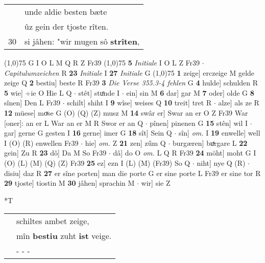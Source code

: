 \documentclass[8pt,a4paper,notitlepage]{article}
\begin{document}
\begin{table}[ht]
\begin{minipage}[t]{0.5\linewidth}
\begin{tabular}{rl}
 & unde aldie besten bæte\\ 
 & ûz gein der tjoste rîten.\\ 
30 & si jâhen: "wir mugen sô \textbf{strîten},\\ 
\end{tabular}
\scriptsize
\line(1,0){75} \newline
G I O L M Q R Z Fr39 \newline
\line(1,0){75} \newline
\textbf{5} \textit{Initiale} I O L Z Fr39   $\cdot$ \textit{Capitulumzeichen} R  \textbf{23} \textit{Initiale} I  \textbf{27} \textit{Initiale} G  \newline
\line(1,0){75} \newline
\textbf{1} zeige] erczeige M gelde zeige Q \textbf{2} bestiu] beste R Fr39 \textbf{3} \textit{Die Verse 355.3-4 fehlen} G  \textbf{4} hulde] schulden R \textbf{5} wie] ÷ie O Hie L Q  $\cdot$ stêt] stuͤnde I  $\cdot$ ein] sin M \textbf{6} dar] gar M \textbf{7} oder] olde G \textbf{8} sînen] Den L Fr39  $\cdot$ schilt] shiht I \textbf{9} wîse] weises Q \textbf{10} treit] tret R  $\cdot$ alze] als ze R \textbf{12} müese] moͮse G (O) (Q) (Z) musz M \textbf{14} swâr er] Swar an er O Z Fr39 War [oner]: an er L War an er M R Swor er an Q  $\cdot$ pînen] pinenen G \textbf{15} stên] wil I  $\cdot$ gar] gerne G gesten I \textbf{16} gerne] imer G \textbf{18} sît] Sein Q  $\cdot$ sîn] \textit{om.} I \textbf{19} enwelle] well I (O) (R) enwellen Fr39  $\cdot$ hie] \textit{om.} Z \textbf{21} zen] zűm Q  $\cdot$ burgæren] buͯrgare L \textbf{22} gein] Zu R \textbf{23} dô] Da M So Fr39  $\cdot$ dâ] do O \textit{om.} L Q R Fr39 \textbf{24} möht] moht G I (O) (L) (M) (Q) (Z) Fr39 \textbf{25} ez] ezn I (L) (M) (Fr39) So Q  $\cdot$ niht] nye Q (R)  $\cdot$ disiu] daz R \textbf{27} er sîne porten] man die porte G er sine porte L Fr39 er sine tor R \textbf{29} tjoste] tiostin M \textbf{30} jâhen] sprachin M  $\cdot$ wir] sie Z \newline
\end{minipage}
\hspace{0.5cm}
\begin{minipage}[t]{0.5\linewidth}
\small
\begin{center}*T
\end{center}
\begin{tabular}{rl}
 & schiltes ambet zeige,\\ 
 & mîn \textbf{bestiu} zuht \textbf{ist} veige.\\ 
 & \multicolumn{1}{l}{ - - - }\\ 

\end{tabular}
\end{minipage}
\end{table}
\end{document}
